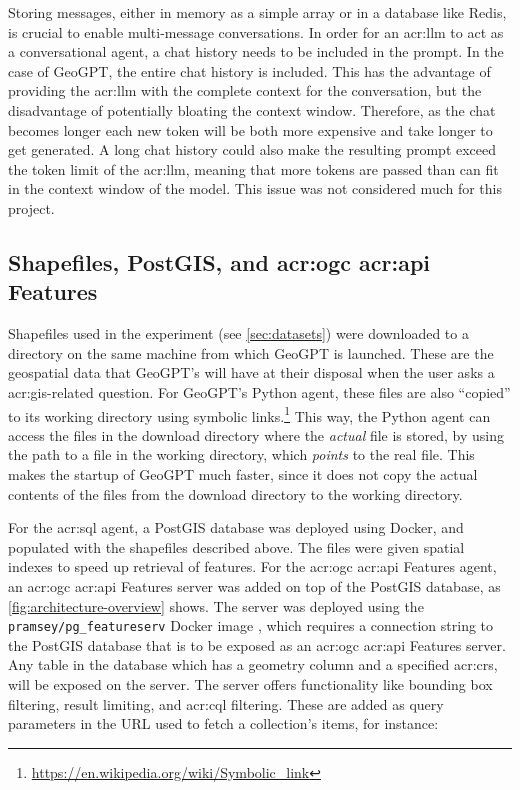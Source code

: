 Storing messages, either in memory as a simple array or in a database like Redis, is crucial to enable multi-message conversations. In order for an \gls{acr:llm} to act as a conversational agent, a chat history needs to be included in the prompt. In the case of GeoGPT, the entire chat history is included. This has the advantage of providing the \gls{acr:llm} with the complete context for the conversation, but the disadvantage of potentially bloating the context window. Therefore, as the chat becomes longer each new token will be both more expensive and take longer to get generated. A long chat history could also make the resulting prompt exceed the token limit of the \gls{acr:llm}, meaning that more tokens are passed than can fit in the context window of the model. This issue was not considered much for this project.

\subsection[Shapefiles, PostGIS, and OGC API Features]{Shapefiles, PostGIS, and \acrshort{acr:ogc} \acrshort{acr:api} Features}
\label{subsec:postgis-and-oaf-architecture}

Shapefiles used in the experiment (see \autoref{sec:datasets}) were downloaded to a directory on the same machine from which GeoGPT is launched. These are the geospatial data that GeoGPT's will have at their disposal when the user asks a \acrshort{acr:gis}-related question. For GeoGPT's Python agent, these files are also \enquote{copied} to its working directory using symbolic links.\footnote{\url{https://en.wikipedia.org/wiki/Symbolic_link}} This way, the Python agent can access the files in the download directory where the \textit{actual} file is stored, by using the path to a file in the working directory, which \textit{points} to the real file. This makes the startup of GeoGPT much faster, since it does not copy the actual contents of the files from the download directory to the working directory.

For the \acrshort{acr:sql} agent, a PostGIS database was deployed using Docker, and populated with the shapefiles described above. The files were given spatial indexes to speed up retrieval of features. For the \acrshort{acr:ogc} \acrshort{acr:api} Features agent,  an \acrshort{acr:ogc} \acrshort{acr:api} Features server was added on top of the PostGIS database, as \autoref{fig:architecture-overview} shows. The server was deployed using the \texttt{pramsey/pg\_featureserv} Docker image \citep{crunchydataCrunchyDataPg_featureserv2024}, which requires a connection string to the PostGIS database that is to be exposed as an \acrshort{acr:ogc} \acrshort{acr:api} Features server. Any table in the database which has a geometry column and a specified \gls{acr:crs}, will be exposed on the server. The server offers functionality like bounding box filtering, result limiting, and \acrshort{acr:cql} filtering. These are added as query parameters in the URL used to fetch a collection's items, for instance:

